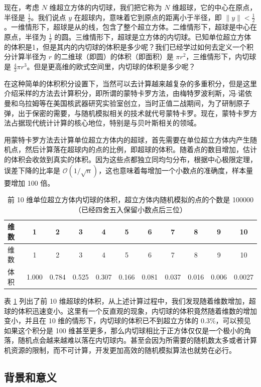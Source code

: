 \documentclass[12pt,a4paper,UTF8,twoside]{book}
\theoremstyle{definition}
\theoremstyle{definition}
\theoremstyle{definition}
\theoremstyle{remark}
\begin{document}
现在，考虑 \(N\) 维超立方体的内切球，我们把它称为 \(N\) 维超球，它的中心在原点，半径是 \(\frac{1}{2}\)。我们说点 \(y\) 在超球内，意味着它到原点的距离小于半径，即 \(\| y \| < \frac{1}{2}\)。一维情形下，超球是从的线，包含了整个超立方体。二维情形下，超球是中心在原点，半径为 \(\frac{1}{2}\) 的圆。三维情形下，超球是立方体的内切球。已知单位超立方体的体积是1，但是其内的内切球的体积是多少呢？我们已经学过如何去定义一个积分计算半径为 \(r\) 的二维球（即圆）的体积（即面积）是 \(\pi r^2\)，三维情形下，内切球是 \(\frac{4}{3}\pi r^3\)。但是更高维的欧式空间里，内切球的体积是多少呢？

在这种简单的体积积分设置下，当然可以去计算越来越复杂的多重积分，但是这里介绍采样的方法去计算积分，即所谓的蒙特卡罗方法，由梅特罗波利斯，冯\(\cdot\)诺依曼和乌拉姆等在美国核武器研究实验室创立，当时正值二战期间，为了研制原子弹，出于保密的需要，与随机模拟相关的技术就代号蒙特卡罗。现在，蒙特卡罗方法占据现代统计计算的核心地位，特别是与贝叶斯相关的领域。

用蒙特卡罗方法去计算单位超立方体内的超球，首先需要在单位超立方体内产生随机点，然后计算落在超球内的点的比例，即超球的体积。随着点的数目增加，估计的体积会收敛到真实的体积。因为这些点都独立同均匀分布，根据中心极限定理，误差下降的比率是 \(\mathcal{O}\left( 1 / \sqrt{n} \right)\)，这也意味着每增加一个小数点的准确度，样本量要增加 100 倍。

\begin{longtable}[]{@{}lcccccccccc@{}}
\caption{\label{tab:calculate-volume-of-hyperball} 前 10 维单位超立方体内切球的体积，超立方体内随机模拟的点的个数是 100000（已经四舍五入保留小数点后三位）}\tabularnewline
\toprule
维数 & 1 & 2 & 3 & 4 & 5 & 6 & 7 & 8 & 9 & 10\tabularnewline
\midrule
\endfirsthead
\toprule
维数 & 1 & 2 & 3 & 4 & 5 & 6 & 7 & 8 & 9 & 10\tabularnewline
\midrule
\endhead
体积 & 1.000 & 0.784 & 0.525 & 0.307 & 0.166 & 0.081 & 0.037 & 0.016 & 0.006 & 0.0027\tabularnewline
\bottomrule
\end{longtable}

表 \ref{tab:calculate-volume-of-hyperball} 列出了前 10 维超球的体积，从上述计算过程中，我们发现随着维数增加，超球的体积迅速变小。这里有一个反直观的现象，内切球的体积竟然随着维数的增加变小，并且在 10 维的情形下，内切球的体积已不到超立方体的 0.3\%，可以预见如果这个积分是 100 维甚至更多，那么内切球相比于正方体仅仅是一个极小的角落，随机点会越来越难以落在内切球内。甚至会因为所需要的随机数太多或者计算机资源的限制，而不可计算，开发更加高效的随机模拟算法也就势在必行。

\hypertarget{subsec:motivations}{%
\subsection{背景和意义}\label{subsec:motivations}}
\end{document}
